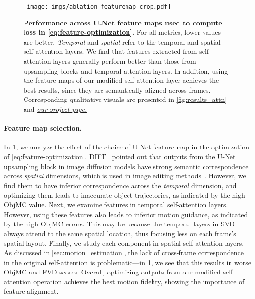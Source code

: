 \documentclass{article} \usepackage{iclr2025_conference,times}
\begin{document}
\begin{figure}[t]
\centering
\texttt{[image: imgs/ablation\_featuremap-crop.pdf]}
\caption{\textbf{Performance across U-Net feature maps used to compute loss in \cref{eq:feature-optimization}.}
For all metrics, lower values are better.
\textit{Temporal} and \textit{spatial} refer to the temporal and spatial self-attention layers. 
We find that features extracted from self-attention layers generally perform better than those from upsampling blocks and temporal attention layers.
In addition, using the feature maps of our modified self-attention layer achieves the best results, since they are semantically aligned across frames.
Corresponding qualitative visuals are presented in \cref{fig:results_attn} and \href{https://kmcode1.github.io/Projects/SG-I2V\#ablation-unet-featuremap}{\textit{our project page.}}
}
\label{tab:results_attn}
\vspace{-2mm}
\end{figure}
\vspace{-0.5mm}





\paragraph{Feature map selection.}
In \cref{tab:results_attn}, we analyze the effect of the choice of U-Net feature map in the optimization of \cref{eq:feature-optimization}.
DIFT~\citep{tang2023emergent} pointed out that outputs from the U-Net upsampling block in image diffusion models have strong semantic correspondence across \textit{spatial} dimensions, which is used in image editing methods~\citep{shi2024dragdiffusion}. However, we find them to have inferior correspondence across the \textit{temporal} dimension, and optimizing them leads to inaccurate object trajectories, as indicated by the high ObjMC value.
Next, we examine features in temporal self-attention layers.
However, using these features also leads to inferior motion guidance, as indicated by the high ObjMC errors.
This may be because the temporal layers in SVD always attend to the same spatial location, thus focusing less on each frame's spatial layout.
Finally, we study each component in spatial self-attention layers.
As discussed in \cref{sec:motion_estimation}, the lack of cross-frame correspondence in the original self-attention is problematic---in \cref{tab:results_attn}, we see that this results in worse ObjMC and FVD scores. Overall, optimizing outputs from our modified self-attention operation achieves the best motion fidelity, showing the importance of feature alignment.
\end{document}
